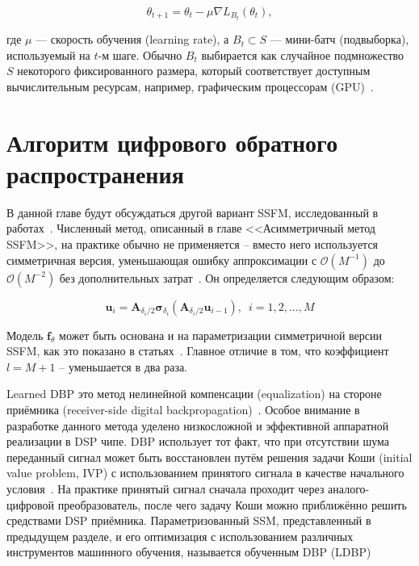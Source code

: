 \begin{equation}
	\theta_{t+1} = \theta_t - \mu \nabla L_{B_t} (\theta_t),
\end{equation}

где $\mu$ — скорость обучения (learning rate), а $B_t \subset S$ — мини-батч (подвыборка), используемый на $t$-м шаге.
Обычно $B_t$ выбирается как случайное подмножество $S$ некоторого фиксированного размера, который соответствует доступным вычислительным ресурсам, например, графическим процессорам (GPU)~\cite{hager2020}.

\section{Алгоритм цифрового обратного распространения}

В данной главе будут обсуждаться другой вариант SSFM, исследованный в работах~\cite{agrawal2007nonlinear, hager2020}.
Численный метод, описанный в главе <<Асимметричный метод SSFM>>, на практике обычно не применяется -- вместо него используется симметричная версия,
уменьшающая ошибку аппроксимации с $\mathcal{O}(M^{-1})$ до $\mathcal{O}(M^{-2})$ без дополнительных затрат~\cite{agrawal2007nonlinear}.
Он определяется следующим образом:

\begin{equation}
	\mathbf{u}_i = \mathbf{A}_{\delta_i/2} \mathbf{\sigma}_{\delta_i} \left( \mathbf{A}_{\delta_i/2} \mathbf{u}_{i-1} \right), \,\,\, i = 1,2,\ldots,M
\end{equation}

Модель $\mathbf{f}_{\theta}$ может быть основана и на параметризации симметричной версии SSFM, как это показано в статьях~\cite{hager2018, pfister2021}.
Главное отличие в том, что коэффициент $l = M+1$ -- уменьшается в два раза.

Learned DBP это метод нелинейной компенсации (equalization) на стороне приёмника (receiver-side digital backpropagation)~\cite{hager2018, hager2020}.
Особое внимание в разработке данного метода уделено низкосложной и эффективной аппаратной реализации в DSP чипе.
DBP использует тот факт, что при отсутствии шума переданный сигнал может быть восстановлен путём решения задачи Коши
(initial value problem, IVP) с использованием принятого сигнала в качестве начального условия~\cite{Pare1996}.
На практике принятый сигнал сначала проходит через аналого-цифровой преобразователь, после чего задачу Коши можно приближённо решить средствами DSP приёмника.
Параметризованный SSM, представленный в предыдущем разделе, и его оптимизация с использованием различных инструментов машинного обучения,
называется обученным DBP (LDBP)

